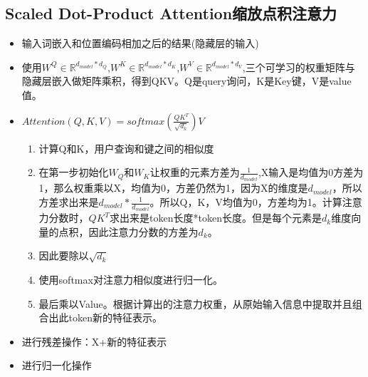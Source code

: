 \documentclass[UTF8]{ctexart}
\begin{document}
\subsection{Scaled Dot-Product Attention缩放点积注意力}
\begin{itemize}
    \item 输入词嵌入和位置编码相加之后的结果(隐藏层的输入)
    \item 使用$W^{Q}\in \mathbb{R} ^{d_{model}*d_{Q}}$,$W^{K}\in \mathbb{R} ^{d_{model}*d_{K}}$,$W^{V}\in \mathbb{R} ^{d_{model}*d_{V}}$,三个可学习的权重矩阵与隐藏层嵌入做矩阵乘积，得到QKV。Q是query询问，K是Key键，V是value值。
    \item $Attention(Q,K,V)=softmax(\frac{QK^{T}}{\sqrt{d_{k}}})V$
    \begin{enumerate}
        \item 计算Q和K，用户查询和键之间的相似度
        \item 在第一步初始化$W_{Q}$和$W_{K}$让权重的元素方差为$\frac{1}{d_{model}}$,X输入是均值为0方差为1，那么权重乘以X，均值为0，方差仍然为1，因为X的维度是$d_{model}$，所以方差求出来是$d_{model}*\frac{1}{d_{model}}$。所以Q，K，V均值为0，方差均为1。计算注意力分数时，$QK^{T}$求出来是token长度*token长度。但是每个元素是$d_k$维度向量的点积，因此注意力分数的方差为$d_k$。
        \item 因此要除以$\sqrt{d_{k}}$
        \item 使用softmax对注意力相似度进行归一化。
        \item 最后乘以Value。根据计算出的注意力权重，从原始输入信息中提取并且组合出此token新的特征表示。
    \end{enumerate}
    \item 进行残差操作：X+新的特征表示
    \item 进行归一化操作
\end{itemize}
\end{document}

